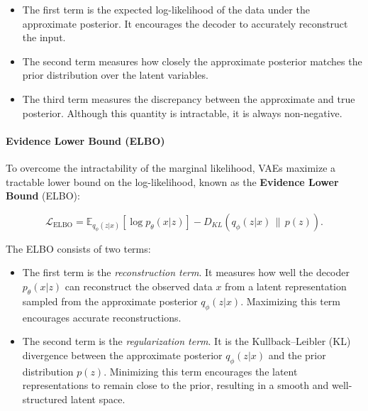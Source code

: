 \begin{itemize}
    \item The first term is the expected log-likelihood of the data under the approximate posterior. It encourages the decoder to accurately reconstruct the input.

    \item The second term measures how closely the approximate posterior matches the prior distribution over the latent variables.

    \item The third term measures the discrepancy between the approximate and true posterior. Although this quantity is intractable, it is always non-negative.
\end{itemize}



\paragraph{Evidence Lower Bound (ELBO)}

To overcome the intractability of the marginal likelihood, VAEs maximize a tractable lower bound on the log-likelihood, known as the \textbf{Evidence Lower Bound} (ELBO):

\begin{equation}
    \label{eq:ELBO}
    \mathcal{L}_{\mathrm{ELBO}}
    =
    \mathbb{E}_{q_\phi(z|x)}
    \left[
        \log p_\theta(x|z)
    \right]
    -
    D_{KL}
    \left(
        q_\phi(z|x)
        \,\|\,p(z)
    \right).
\end{equation}

The ELBO consists of two terms:

\begin{itemize}
    \item The first term is the \textit{reconstruction term}. It measures how well the decoder $p_\theta(x|z)$ can reconstruct the observed data $x$ from a latent representation sampled from the approximate posterior $q_\phi(z|x)$. Maximizing this term encourages accurate reconstructions.

    \item The second term is the \textit{regularization term}. It is the Kullback--Leibler (KL) divergence between the approximate posterior $q_\phi(z|x)$ and the prior distribution $p(z)$. Minimizing this term encourages the latent representations to remain close to the prior, resulting in a smooth and well-structured latent space.
\end{itemize}

